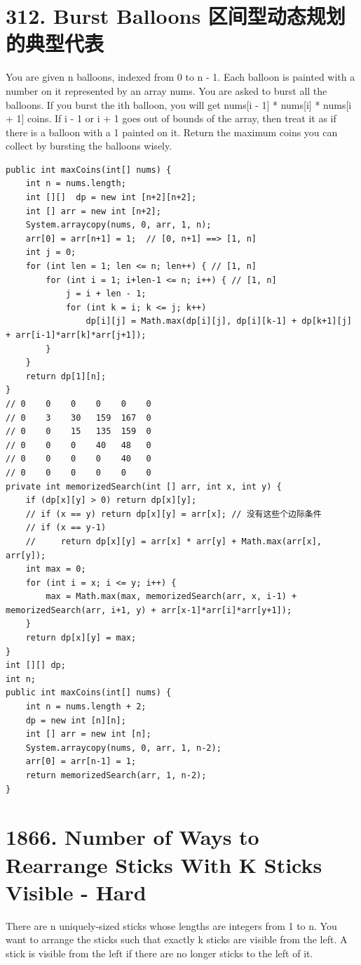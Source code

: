\documentclass[9pt, b5paaper]{book}
\begin{document}
\section{312. Burst Balloons 区间型动态规划的典型代表}
\label{sec-1-6}
You are given n balloons, indexed from 0 to n - 1. Each balloon is painted with a number on it represented by an array nums. You are asked to burst all the balloons.
If you burst the ith balloon, you will get nums[i - 1] * nums[i] * nums[i + 1] coins. If i - 1 or i + 1 goes out of bounds of the array, then treat it as if there is a balloon with a 1 painted on it.
Return the maximum coins you can collect by bursting the balloons wisely.
\begin{verbatim}
public int maxCoins(int[] nums) {
    int n = nums.length;
    int [][]  dp = new int [n+2][n+2];
    int [] arr = new int [n+2];
    System.arraycopy(nums, 0, arr, 1, n);
    arr[0] = arr[n+1] = 1;  // [0, n+1] ==> [1, n]
    int j = 0;
    for (int len = 1; len <= n; len++) { // [1, n]
        for (int i = 1; i+len-1 <= n; i++) { // [1, n]
            j = i + len - 1;
            for (int k = i; k <= j; k++) 
                dp[i][j] = Math.max(dp[i][j], dp[i][k-1] + dp[k+1][j] + arr[i-1]*arr[k]*arr[j+1]);
        }
    }
    return dp[1][n];
}
// 0    0    0    0    0    0
// 0    3    30   159  167  0
// 0    0    15   135  159  0
// 0    0    0    40   48   0
// 0    0    0    0    40   0
// 0    0    0    0    0    0
private int memorizedSearch(int [] arr, int x, int y) {
    if (dp[x][y] > 0) return dp[x][y];
    // if (x == y) return dp[x][y] = arr[x]; // 没有这些个边际条件
    // if (x == y-1) 
    //     return dp[x][y] = arr[x] * arr[y] + Math.max(arr[x], arr[y]);
    int max = 0;
    for (int i = x; i <= y; i++) {
        max = Math.max(max, memorizedSearch(arr, x, i-1) + memorizedSearch(arr, i+1, y) + arr[x-1]*arr[i]*arr[y+1]);
    }
    return dp[x][y] = max;
}
int [][] dp;
int n;
public int maxCoins(int[] nums) {
    int n = nums.length + 2;
    dp = new int [n][n];
    int [] arr = new int [n];
    System.arraycopy(nums, 0, arr, 1, n-2);
    arr[0] = arr[n-1] = 1;
    return memorizedSearch(arr, 1, n-2);
}
\end{verbatim}


\section{1866. Number of Ways to Rearrange Sticks With K Sticks Visible - Hard}
\label{sec-1-7}
There are n uniquely-sized sticks whose lengths are integers from 1 to n. You want to arrange the sticks such that exactly k sticks are visible from the left. A stick is visible from the left if there are no longer sticks to the left of it.
\end{document}
